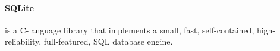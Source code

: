 \paragraph{SQLite}
is a C-language library that implements a small, fast, self-contained, high-reliability, full-featured, SQL database engine.
